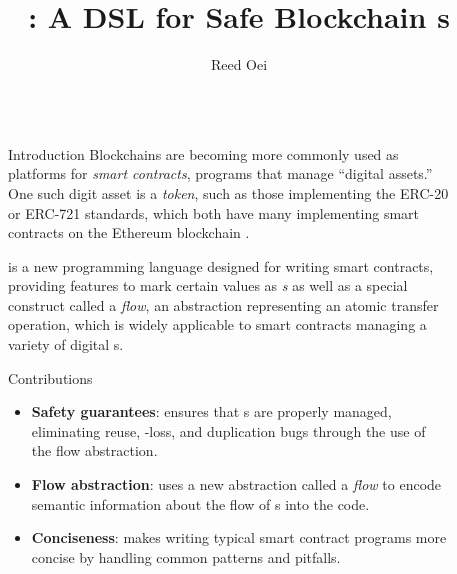 \documentclass[usenames, dvipsnames, final]{beamer}
\title{\langName: A DSL for Safe Blockchain \AssetTxt{}s}
\author{Reed Oei}
\institute[shortinst]{University of Illinois}
\newlength{\sepwidth}
\newlength{\colwidth}
\newcommand{\separatorcolumn}{\begin{column}{\sepwidth}\end{column}}
\begin{document}
\begin{frame}[t]
\begin{columns}[t]
\separatorcolumn

\begin{column}{\colwidth}

  \begin{block}{Introduction}
      Blockchains are becoming more commonly used as platforms for \emph{smart contracts}, programs that manage ``digital assets.'' 
      One such digit asset is a \emph{token}, such as those implementing the ERC-20 or ERC-721 standards, which both have many implementing smart contracts on the Ethereum blockchain .

      \langName is a new programming language designed for writing smart contracts, providing features to mark certain values as \emph{\assetTxt{}s} as well as a special construct called a \emph{flow}, an abstraction representing an atomic transfer operation, which is widely applicable to smart contracts managing a variety of digital \assetTxt{}s.
  \end{block}

    \begin{alertblock}{Contributions}
      \begin{itemize}
          \item \textbf{Safety guarantees}: \langName ensures that \assetTxt{}s are properly managed, eliminating reuse, \assetTxt-loss, and duplication bugs through the use of the flow abstraction.
          \item \textbf{Flow abstraction}: \langName uses a new abstraction called a \emph{flow} to encode semantic information about the flow of \assetTxt{}s into the code.
          \item \textbf{Conciseness}: \langName makes writing typical smart contract programs more concise by handling common patterns and pitfalls.
      \end{itemize}
    \end{alertblock}
\end{column}

\separatorcolumn

\begin{column}{\colwidth}


\end{column}
\end{columns}
\end{frame}
\end{document}
